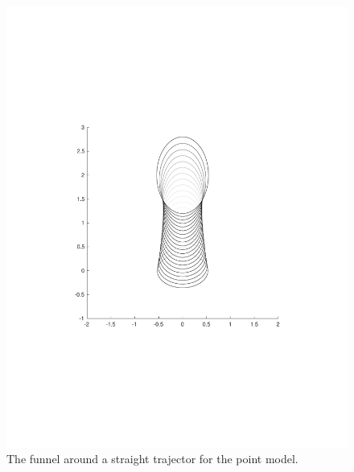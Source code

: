 \begin{figure}
  \centering
  \begin{minipage}{0.4\textwidth}
    \includegraphics[scale=.3]{figures/method/unexpanded-funnel}
    \caption{The funnel around a straight trajector for the point model.}
  \end{minipage}
  \begin{minipage}{0.4\textwidth}

\end{minipage}
\end{figure}
